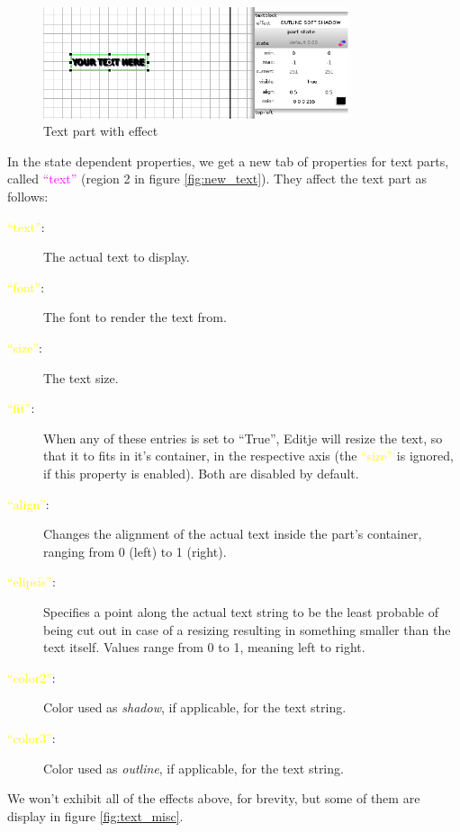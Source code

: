 \documentclass[a4paper]{profusion}
\newcommand{\GUILabel}[1]{\textcolor{magenta}{#1}}
\newcommand{\GUIEditable}[1]{\textcolor{yellow}{#1}} %
\begin{document}
\begin{figure}[h!]
  \centering
  \includegraphics[width=0.8\textwidth]{images/text_effect.png}
  \caption{Text part with effect}
  \label{fig:text_effect}
\end{figure}

In the state dependent properties, we get a new tab of properties for
text parts, called \GUILabel{``text''} (region 2 in figure
\ref{fig:new_text}).  They affect the text part as follows:

\begin{description}
\item[\GUIEditable{``text''}:] The actual text to display.
\item[\GUIEditable{``font''}:] The font to render the text from.


\item[\GUIEditable{``size''}:] The text size.
\item[\GUIEditable{``fit''}:] When any of these entries is set to
  ``True'', Editje will resize the text, so that it to fits in it's
  container, in the respective axis (the \GUIEditable{``size''} is
  ignored, if this property is enabled). Both are disabled by default.
\item[\GUIEditable{``align''}:] Changes the alignment of the actual
  text inside the part's container, ranging from 0 (left) to 1
  (right).
\item[\GUIEditable{``elipsis''}:] Specifies a point along the actual
  text string to be the least probable of being cut out in case of a
  resizing resulting in something smaller than the text itself. Values
  range from 0 to 1, meaning left to right.
\item[\GUIEditable{``color2''}:] Color used as \emph{shadow}, if
  applicable, for the text string.
\item[\GUIEditable{``color3''}:] Color used as \emph{outline}, if
  applicable, for the text string.
\end{description}

We won't exhibit all of the effects above, for brevity, but some of
them are display in figure \ref{fig:text_misc}.
\end{document}
